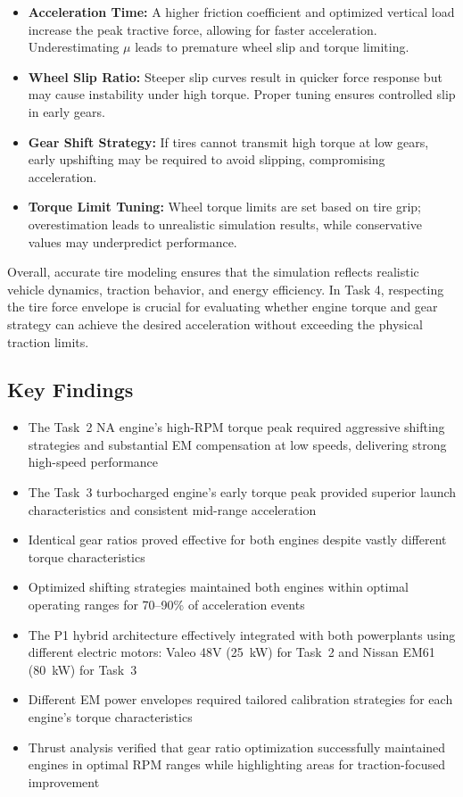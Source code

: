 \begin{itemize}
  \item \textbf{Acceleration Time:} A higher friction coefficient and optimized vertical load increase the peak tractive force, allowing for faster acceleration. Underestimating $\mu$ leads to premature wheel slip and torque limiting.
  \item \textbf{Wheel Slip Ratio:} Steeper slip curves result in quicker force response but may cause instability under high torque. Proper tuning ensures controlled slip in early gears.
  \item \textbf{Gear Shift Strategy:} If tires cannot transmit high torque at low gears, early upshifting may be required to avoid slipping, compromising acceleration.
  \item \textbf{Torque Limit Tuning:} Wheel torque limits are set based on tire grip; overestimation leads to unrealistic simulation results, while conservative values may underpredict performance.
\end{itemize}

Overall, accurate tire modeling ensures that the simulation reflects realistic vehicle dynamics, traction behavior, and energy efficiency. In Task 4, respecting the tire force envelope is crucial for evaluating whether engine torque and gear strategy can achieve the desired acceleration without exceeding the physical traction limits.

\subsection{Key Findings}

\begin{itemize}
    \item The Task~2 NA engine's high-RPM torque peak required aggressive shifting strategies and substantial EM compensation at low speeds, delivering strong high-speed performance
    \item The Task~3 turbocharged engine's early torque peak provided superior launch characteristics and consistent mid-range acceleration
    \item Identical gear ratios proved effective for both engines despite vastly different torque characteristics
    \item Optimized shifting strategies maintained both engines within optimal operating ranges for 70--90\% of acceleration events
    \item The P1 hybrid architecture effectively integrated with both powerplants using different electric motors: Valeo 48V (25~kW) for Task~2 and Nissan EM61 (80~kW) for Task~3
    \item Different EM power envelopes required tailored calibration strategies for each engine's torque characteristics
    \item Thrust analysis verified that gear ratio optimization successfully maintained engines in optimal RPM ranges while highlighting areas for traction-focused improvement
\end{itemize}

